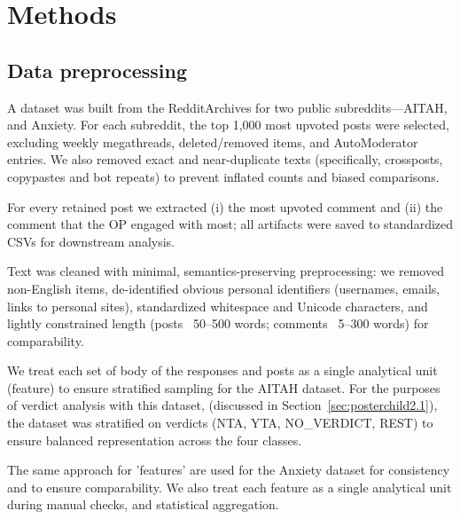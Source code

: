 \section{Methods} \label{sec:Methods}

\subsection{Data preprocessing}
A dataset was built from the RedditArchives for two public subreddits—AITAH, and Anxiety. For each subreddit, the top 1,000 most upvoted posts were selected, excluding weekly megathreads, deleted/removed items, and AutoModerator entries. We also removed exact and near-duplicate texts (specifically, crossposts, copypastes and bot repeats) to prevent inflated counts and biased comparisons.

For every retained post we extracted (i) the most upvoted comment and (ii) the comment that the OP engaged with most; all artifacts were saved to standardized CSVs for downstream analysis.

Text was cleaned with minimal, semantics-preserving preprocessing: we removed non-English items, de-identified obvious personal identifiers (usernames, emails, links to personal sites), standardized whitespace and Unicode characters, and lightly constrained length (posts ~50–500 words; comments ~5–300 words) for comparability.

We treat each set of body of the responses and posts as a single analytical unit (feature) to ensure stratified sampling for the AITAH dataset. For the purposes of verdict analysis with this dataset, (discussed in Section~\ref{sec:posterchild2.1}), the dataset was stratified on verdicts (NTA, YTA, NO\_VERDICT, REST) to ensure balanced representation across the four classes.

The same approach for 'features' are used for the Anxiety dataset for consistency and to ensure comparability. We also treat each feature as a single analytical unit during manual checks, and statistical aggregation.

